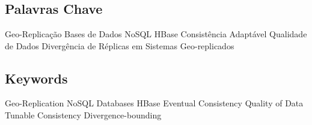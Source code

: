 \newpage

\chapter*{}
\thispagestyle{empty}

\section*{Palavras Chave}
{\large %

\noindent Geo-Replica\c{c}\~ao
\noindent Bases de Dados NoSQL
\noindent HBase
\noindent Consist\^encia Adapt\'avel %
\noindent Qualidade de Dados
\noindent Divergência de Réplicas em Sistemas Geo-replicados
}

\section*{Keywords}

{\large %
\noindent Geo-Replication
\noindent NoSQL Databases
\noindent HBase
\noindent Eventual Consistency
\noindent Quality of Data
\noindent Tunable Consistency
\noindent Divergence-bounding

}

\vfill

\cleardoublepage
\pagestyle{plain}
\def\contentsname{Index}
\tableofcontents
\newpage
\listoffigures
\newpage
\listoftables
\cleardoublepage
